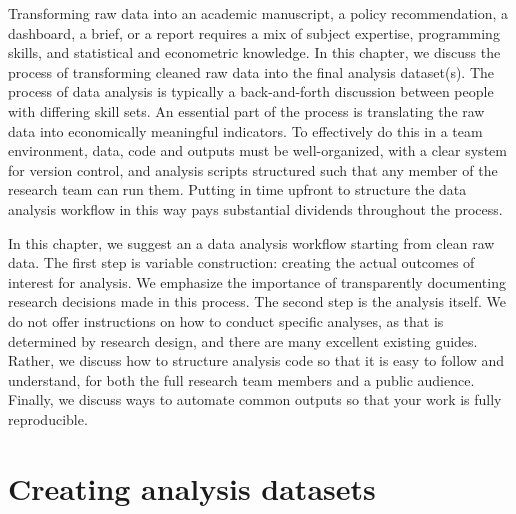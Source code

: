 
\begin{fullwidth}


Transforming raw data into an academic manuscript,
a policy recommendation, a dashboard, a brief, or a report
requires a mix of subject expertise, programming skills,
and statistical and econometric knowledge.
In this chapter, we discuss the process of transforming
cleaned raw data into the final analysis dataset(s).
The process of data analysis is typically
a back-and-forth discussion between people
with differing skill sets.
An essential part of the process is translating the
raw data into economically meaningful indicators.
To effectively do this in a team environment,
data, code and outputs must be well-organized,
with a clear system for version control,
and analysis scripts structured such that any member of the research team can run them.
Putting in time upfront to structure the data analysis workflow
in this way pays substantial dividends throughout the process.

In this chapter, we suggest an a data analysis workflow
starting from clean raw data.
The first step is variable construction:
creating the actual outcomes of interest for analysis.
We emphasize the importance of transparently documenting research decisions
made in this process.
The second step is the analysis itself.
We do not offer instructions on how to conduct specific analyses,
as that is determined by research design,
and there are many excellent existing guides.
Rather, we discuss how to structure analysis code
so that it is easy to follow and understand,
for both the full research team members and a public audience.
Finally, we discuss ways to automate common outputs
so that your work is fully reproducible.

\end{fullwidth}


\section{Creating analysis datasets}

